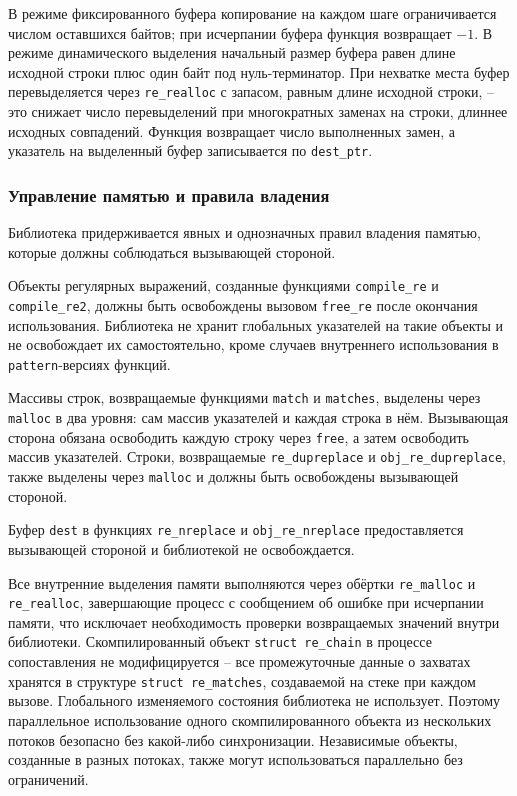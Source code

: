 В режиме фиксированного буфера копирование на каждом шаге ограничивается числом оставшихся байтов; при исчерпании буфера функция возвращает $-1$. В режиме динамического выделения начальный размер буфера равен длине исходной строки плюс один байт под нуль-терминатор. При нехватке места буфер перевыделяется через \verb`re_realloc` с запасом, равным длине исходной строки, -- это снижает число перевыделений при многократных заменах на строки, длиннее исходных совпадений. Функция возвращает число выполненных замен, а указатель на выделенный буфер записывается по \verb`dest_ptr`.

\subsubsection{Управление памятью и правила владения}

Библиотека придерживается явных и однозначных правил владения памятью, которые должны соблюдаться вызывающей стороной.

Объекты регулярных выражений, созданные функциями \verb`compile_re` и \verb`compile_re2`, должны быть освобождены вызовом \verb`free_re` после окончания использования. Библиотека не хранит глобальных указателей на такие объекты и не освобождает их самостоятельно, кроме случаев внутреннего использования в \verb`pattern`-версиях функций.

Массивы строк, возвращаемые функциями \verb`match` и \verb`matches`, выделены через \verb`malloc` в два уровня: сам массив указателей и каждая строка в нём. Вызывающая сторона обязана освободить каждую строку через \verb`free`, а затем освободить массив указателей. Строки, возвращаемые \verb`re_dupreplace` и \verb`obj_re_dupreplace`, также выделены через \verb`malloc` и должны быть освобождены вызывающей стороной.

Буфер \verb`dest` в функциях \verb`re_nreplace` и \verb`obj_re_nreplace` предоставляется вызывающей стороной и библиотекой не освобождается.

Все внутренние выделения памяти выполняются через обёртки \verb`re_malloc` и \verb`re_realloc`, завершающие процесс с сообщением об ошибке при исчерпании памяти, что исключает необходимость проверки возвращаемых значений внутри библиотеки. Скомпилированный объект \verb`struct re_chain` в процессе сопоставления не модифицируется -- все промежуточные данные о захватах хранятся в структуре \verb`struct re_matches`, создаваемой на стеке при каждом вызове. Глобального изменяемого состояния библиотека не использует. Поэтому параллельное использование одного скомпилированного объекта из нескольких потоков безопасно без какой-либо синхронизации. Независимые объекты, созданные в разных потоках, также могут использоваться параллельно без ограничений.

